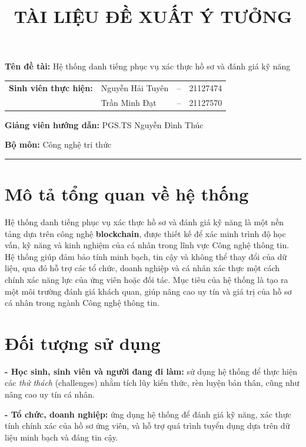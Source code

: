 \documentclass[a4paper, 12pt]{article}	 %
\title{\textbf{\color{DarkRed} TÀI LIỆU ĐỀ XUẤT Ý TƯỞNG}}
\author{}
\date{} %
\begin{document}
\maketitle %

\vspace{-1cm}
\textbf{Tên đề tài:} Hệ thống danh tiếng phục vụ xác thực hồ sơ và đánh giá kỹ năng
\vspace{5pt}

\begin{tabular}{@{} l l l l @{}}
  \textbf{Sinh viên thực hiện:} & Nguyễn Hải Tuyên & -- & 21127474 \\
                                & Trần Minh Đạt    & -- & 21127570
\end{tabular}
\vspace{5pt}

\textbf{Giảng viên hướng dẫn:} PGS.TS Nguyễn Đình Thúc
\vspace{5pt}

\textbf{Bộ môn:} Công nghệ tri thức

\rule{\textwidth}{0.4pt}

\section*{Mô tả tổng quan về hệ thống}

Hệ thống danh tiếng phục vụ xác thực hồ sơ và đánh giá kỹ năng là một nền tảng dựa trên công nghệ \textbf{blockchain}, 
được thiết kế để xác minh trình độ học vấn, kỹ năng và kinh nghiệm của cá nhân trong lĩnh vực Công nghệ thông tin. 
Hệ thống giúp đảm bảo tính minh bạch, tin cậy và không thể thay đổi của dữ liệu, qua đó hỗ trợ các tổ chức, 
doanh nghiệp và cá nhân xác thực một cách chính xác năng lực của ứng viên hoặc đối tác.
Mục tiêu của hệ thống là tạo ra một môi trường đánh giá khách quan, giúp nâng cao uy tín và giá trị của 
hồ sơ cá nhân trong ngành Công nghệ thông tin.

\section*{Đối tượng sử dụng}

\textbf{- Học sinh, sinh viên và người đang đi làm:} sử dụng hệ thống để thực hiện các \textit{thử thách} (challenges) nhằm tích lũy kiến thức,
rèn luyện bản thân, cũng như nâng cao uy tín cá nhân.
\vspace{4pt}

\textbf{- Tổ chức, doanh nghiệp:} ứng dụng hệ thống để đánh giá kỹ năng, xác thực tính chính xác của hồ sơ ứng viên, 
và hỗ trợ quá trình tuyển dụng dựa trên dữ liệu minh bạch và đáng tin cậy.
\end{document}
